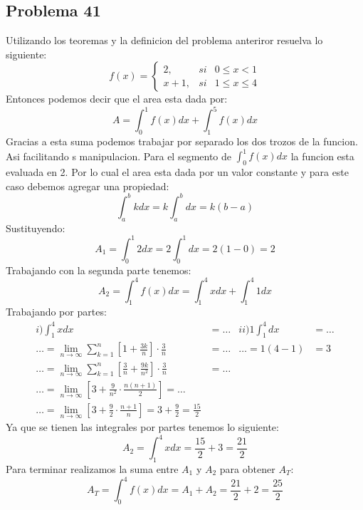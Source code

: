 \documentclass{article}
\begin{document}
\subsection{Problema 41}
Utilizando los teoremas y la definicion del problema anteriror resuelva lo siguiente:
\begin{equation*}
  f(x) = \left\{
  \begin{array}{lcc}
    2,   & si & 0\leq x < 1     \\
    x+1, & si & 1 \leq x \leq 4
  \end{array}
  \right.
\end{equation*}
Entonces podemos decir que el area esta dada por:
\begin{equation}
  A = \int_{0}^{1} f(x)dx + \int_{1}^{5} f(x)dx
\end{equation}
Gracias a esta suma podemos trabajar por separado los dos trozos de la funcion. Asi facilitando s manipulacion.
Para el segmento de $\int_{0}^{1}f(x)dx$ la funcion esta evaluada en 2. Por lo cual el area esta dada por un valor constante y para este caso debemos agregar una propiedad:
\begin{equation}
  \int_{a}^{b}kdx = k\int_{a}^{b}dx = k(b-a)
\end{equation}
Sustituyendo:
\begin{equation}
  A_1=\int_{0}^{1}2dx = 2\int_{0}^{1}dx = 2(1-0)=2
\end{equation}
Trabajando con la segunda parte tenemos:
\begin{equation}
  A_2 = \int_{1}^{4} f(x)dx = \int_{1}^{4}xdx + \int_{1}^{4}1dx
\end{equation}
Trabajando por partes:
\begin{align*}
  i) \int_{1}^{4}xdx                                                                            & =\dots & ii) 1\int_{1}^{4}dx & = \dots \\ \dots=\lim_{n\to\infty} \sum_{k=1}^{n}\left[1+\frac{3k}{n}\right]\cdot\frac{3}{n}&=\dots & \dots = 1(4-1)&=3 \\
  \dots=\lim_{n\to\infty} \sum_{k=1}^{n}\left[\frac{3}{n}+\frac{9k}{n^2}\right]\cdot\frac{3}{n} & =\dots                                 \\ \dots = \lim_{n\to\infty}\left[3+\frac{9}{n^2}\cdot\frac{n(n+1)}{2}\right] = \dots \\ \dots=\lim_{n\to\infty}\left[3+\frac{9}{2}\cdot\frac{n+1}{n}\right]= 3+\frac{9}{2} = \frac{15}{2}
\end{align*}
Ya que se tienen las integrales por partes tenemos lo siguiente:
\begin{equation}
  A_2 = \int_{1}^{4}xdx = \frac{15}{2} + 3 = \frac{21}{2}
\end{equation}
Para terminar realizamos la suma entre \(A_1\) y \(A_2\) para obtener \(A_T\):
\begin{equation}
  A_T = \int_{0}^{4} f(x)dx = A_1 + A_2 = \frac{21}{2} + 2 = \frac{25}{2}
\end{equation}
\end{document}
